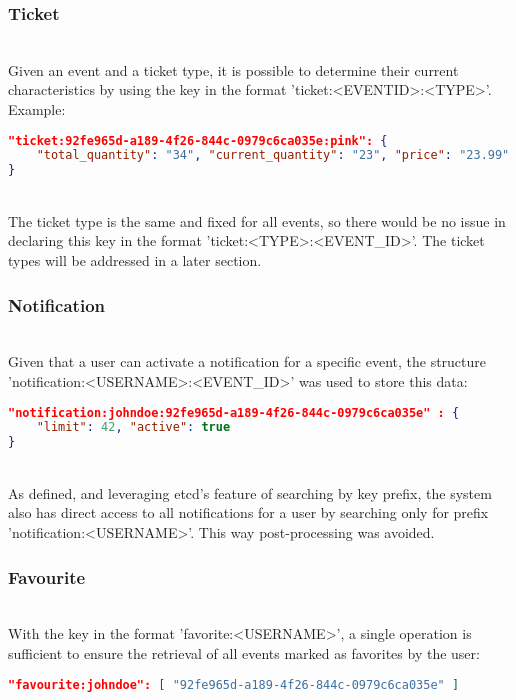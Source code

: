 \documentclass[screen,review]{acmart}
\begin{document}
\subsubsection{Ticket}~\\
Given an event and a ticket type, it is possible to determine their current characteristics by using the key in the format 'ticket:<EVENTID>:<TYPE>'. Example:

\begin{lstlisting}[language=json]
"ticket:92fe965d-a189-4f26-844c-0979c6ca035e:pink": {
    "total_quantity": "34", "current_quantity": "23", "price": "23.99"
}
\end{lstlisting}\\

The ticket type is the same and fixed for all events, so there would be no issue in declaring this key in the format 'ticket:<TYPE>:<EVENT\_ID>'. The ticket types will be addressed in a later section. \\

\subsubsection{Notification}~\\
Given that a user can activate a notification for a specific event, the structure 'notification:<USERNAME>:<EVENT\_ID>' was used to store this data:

\begin{lstlisting}[language=json]
"notification:johndoe:92fe965d-a189-4f26-844c-0979c6ca035e" : {
    "limit": 42, "active": true
}
\end{lstlisting}\\

As defined, and leveraging etcd's feature of searching by key prefix, the system also has direct access to all notifications for a user by searching only for prefix 'notification:<USERNAME>'. This way post-processing was avoided. \\

\subsubsection{Favourite}~\\
With the key in the format 'favorite:<USERNAME>', a single operation is sufficient to ensure the retrieval of all events marked as favorites by the user:

\begin{lstlisting}[language=json]
"favourite:johndoe": [ "92fe965d-a189-4f26-844c-0979c6ca035e" ]
\end{lstlisting}\\
\end{document}
